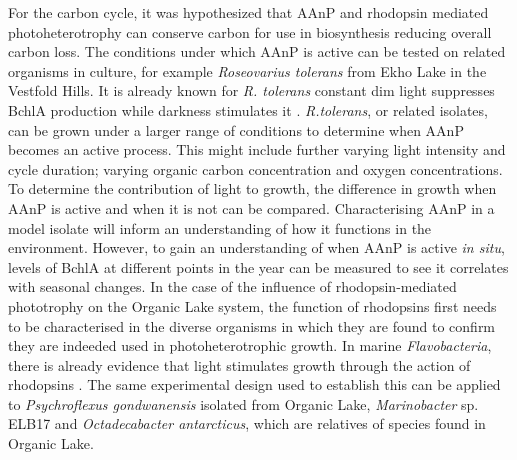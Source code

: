 For the carbon cycle, it was hypothesized that \ac{AAnP} and rhodopsin mediated photoheterotrophy can conserve carbon for use in biosynthesis  reducing overall carbon loss.
The conditions under which \ac{AAnP} is active can be tested on related organisms in culture, for example \emph{Roseovarius tolerans} from Ekho Lake in the Vestfold Hills. 
It is already known for \emph{R. tolerans} constant dim light suppresses \ac{BchlA} production while darkness stimulates it \cite{Labrenz1999}.
\emph{R.tolerans}, or related isolates, can be grown under a larger range of conditions to determine when \ac{AAnP} becomes an active process.
This might include further varying light intensity and cycle duration; varying organic carbon concentration and oxygen concentrations.
To determine the contribution of light to growth, the difference in growth when \ac{AAnP} is active and when it is not can be compared.
Characterising \ac{AAnP} in a model isolate will inform an understanding of how it functions in the environment.
However, to gain an understanding of when \ac{AAnP} is active \emph{in situ}, levels of \ac{BchlA} at different points in the year can be measured to see it correlates with seasonal changes.
In the case of the influence of rhodopsin-mediated phototrophy on the Organic Lake system, the function of rhodopsins first needs to be characterised in the diverse organisms in which they are found to confirm they are indeeded used in photoheterotrophic growth.
In marine \emph{Flavobacteria}, there is already evidence that light stimulates growth through the action of rhodopsins \cite{Gomez-Consarnau2007}.
The same experimental design used to establish this can be applied to \emph{Psychroflexus gondwanensis} isolated from Organic Lake, \emph{Marinobacter} sp. ELB17 and \emph{Octadecabacter antarcticus}, which are relatives of species found in Organic Lake.

